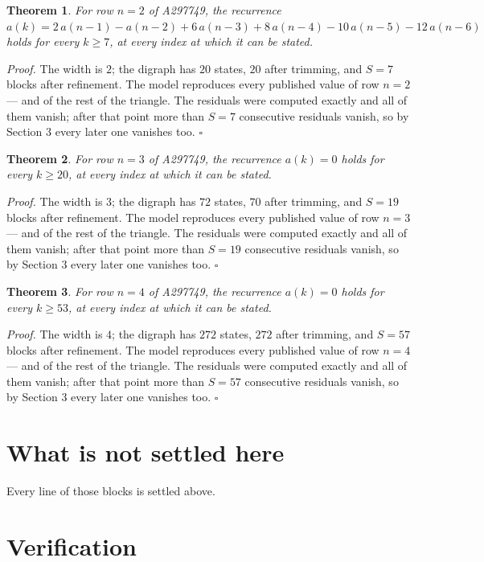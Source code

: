 \documentclass[11pt]{article}
\newtheorem{theorem}{Theorem}
\theoremstyle{definition}
\begin{document}
\begin{theorem} For row $n = 2$ of A297749, the recurrence $a(k) = 2\,a(n-1) - a(n-2) + 6\,a(n-3) + 8\,a(n-4) - 10\,a(n-5) - 12\,a(n-6)$ holds for every $k \ge 7$, at every index at which it can be stated.\end{theorem}

{\itshape Proof.} The width is $2$; the digraph has $20$ states, $20$ after trimming, and $S = 7$ blocks after refinement. The model reproduces every published value of row $n = 2$ --- and of the rest of the triangle. The residuals were computed exactly and all of them vanish; after that point more than $S = 7$ consecutive residuals vanish, so by Section 3 every later one vanishes too. $\square$

\begin{theorem} For row $n = 3$ of A297749, the recurrence $a(k) = 0$ holds for every $k \ge 20$, at every index at which it can be stated.\end{theorem}

{\itshape Proof.} The width is $3$; the digraph has $72$ states, $70$ after trimming, and $S = 19$ blocks after refinement. The model reproduces every published value of row $n = 3$ --- and of the rest of the triangle. The residuals were computed exactly and all of them vanish; after that point more than $S = 19$ consecutive residuals vanish, so by Section 3 every later one vanishes too. $\square$

\begin{theorem} For row $n = 4$ of A297749, the recurrence $a(k) = 0$ holds for every $k \ge 53$, at every index at which it can be stated.\end{theorem}

{\itshape Proof.} The width is $4$; the digraph has $272$ states, $272$ after trimming, and $S = 57$ blocks after refinement. The model reproduces every published value of row $n = 4$ --- and of the rest of the triangle. The residuals were computed exactly and all of them vanish; after that point more than $S = 57$ consecutive residuals vanish, so by Section 3 every later one vanishes too. $\square$

\section{What is not settled here}

Every line of those blocks is settled above.

\section{Verification}
\end{document}
